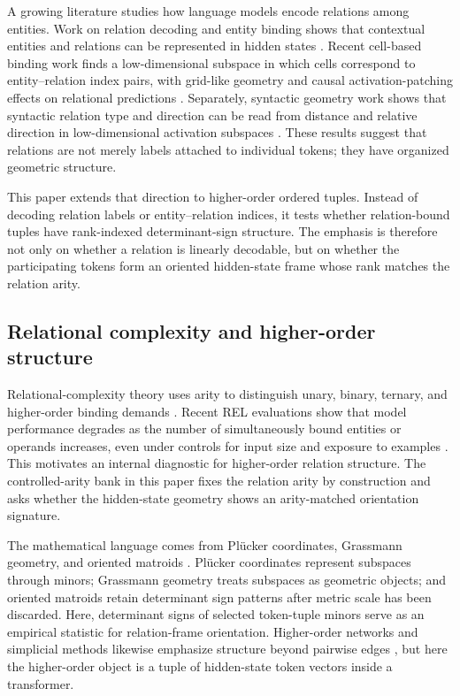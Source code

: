 \documentclass[11pt]{article}
\begin{document}
A growing literature studies how language models encode relations among entities. Work on relation decoding and entity binding shows that contextual entities and relations can be represented in hidden states \citep{hernandez2024linearity,feng2024binding}. Recent cell-based binding work finds a low-dimensional subspace in which cells correspond to entity--relation index pairs, with grid-like geometry and causal activation-patching effects on relational predictions \citep{dai2026cellbinding}. Separately, syntactic geometry work shows that syntactic relation type and direction can be read from distance and relative direction in low-dimensional activation subspaces \citep{diegosimon2024polar}. These results suggest that relations are not merely labels attached to individual tokens; they have organized geometric structure.

This paper extends that direction to higher-order ordered tuples. Instead of decoding relation labels or entity--relation indices, it tests whether relation-bound tuples have rank-indexed determinant-sign structure. The emphasis is therefore not only on whether a relation is linearly decodable, but on whether the participating tokens form an oriented hidden-state frame whose rank matches the relation arity.

\subsection{Relational complexity and higher-order structure}

Relational-complexity theory uses arity to distinguish unary, binary, ternary, and higher-order binding demands \citep{halford1998relational,gentner1983structure}. Recent REL evaluations show that model performance degrades as the number of simultaneously bound entities or operands increases, even under controls for input size and exposure to examples \citep{fesser2026rel}. This motivates an internal diagnostic for higher-order relation structure. The controlled-arity bank in this paper fixes the relation arity by construction and asks whether the hidden-state geometry shows an arity-matched orientation signature.

The mathematical language comes from Pl\"ucker coordinates, Grassmann geometry, and oriented matroids \citep{bjorner1999oriented}. Pl\"ucker coordinates represent subspaces through minors; Grassmann geometry treats subspaces as geometric objects; and oriented matroids retain determinant sign patterns after metric scale has been discarded. Here, determinant signs of selected token-tuple minors serve as an empirical statistic for relation-frame orientation. Higher-order networks and simplicial methods likewise emphasize structure beyond pairwise edges \citep{battiston2020networks,benson2018simplicial}, but here the higher-order object is a tuple of hidden-state token vectors inside a transformer.
\end{document}
